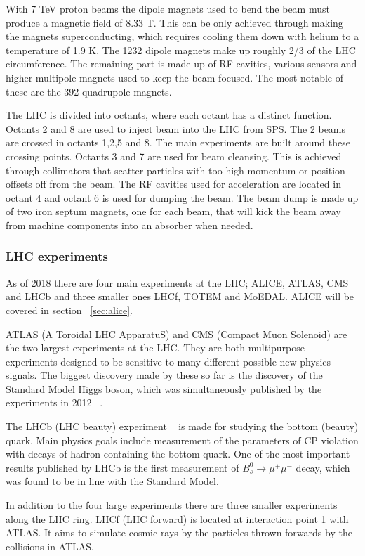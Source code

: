 With 7 TeV proton beams the dipole magnets used to bend the beam must produce a magnetic field of 8.33 T. This can be only achieved through making the magnets superconducting, which requires cooling them down with helium to a temperature of 1.9 K. The 1232 dipole magnets make up roughly 2/3 of the LHC circumference. The remaining part is made up of RF cavities, various sensors and higher multipole magnets used to keep the beam focused. The most notable of these are the 392 quadrupole magnets.

The LHC is divided into octants, where each octant has a distinct function. Octants 2 and 8 are used to inject beam into the LHC from SPS. The 2 beams are crossed in octants 1,2,5 and 8. The main experiments are built around these crossing points. Octants 3 and 7 are used for beam cleansing. This is achieved through collimators that scatter particles with too high momentum or position offsets off from the beam. The RF cavities used for acceleration are located in octant 4 and octant 6 is used for dumping the beam. The beam dump is made up of two iron septum magnets, one for each beam, that will kick the beam away from machine components into an absorber when needed. 


\subsubsection{LHC experiments}
As of 2018 there are four main experiments at the LHC; ALICE, ATLAS, CMS and LHCb and three smaller ones LHCf, TOTEM and MoEDAL. ALICE will be covered in section ~\ref{sec:alice}. 

ATLAS (A Toroidal LHC ApparatuS) and CMS (Compact Muon Solenoid) are the two largest experiments at the LHC. They are both multipurpose experiments designed to be sensitive to many different possible new physics signals. The biggest discovery made by these so far is the discovery of the Standard Model Higgs boson, which was simultaneously published by the experiments in 2012 ~\cite{Atlashiggs, CMShiggs}.

The LHCb (LHC beauty) experiment ~\cite{LHCb} is made for studying the bottom (beauty) quark. Main physics goals include measurement of the parameters of CP violation with decays of hadron containing the bottom quark. One of the most important results published by LHCb is the first measurement of $B_s^0\rightarrow \mu^+ \mu^-$ decay, which was found to be in line with the Standard Model.

In addition to the four large experiments there are three smaller experiments along the LHC ring. LHCf (LHC forward) is located at interaction point 1 with ATLAS. It aims to simulate cosmic rays by the particles thrown forwards by the collisions in ATLAS.

